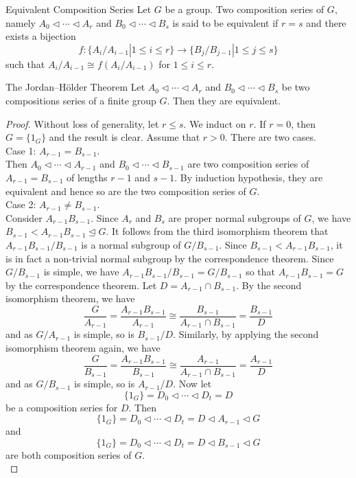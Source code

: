 \documentclass[a4paper]{article}
\begin{document}
\begin{defn}{Equivalent Composition Series}{} Let $G$ be a group. Two composition series of $G$, namely $A_0\triangleleft\cdots\triangleleft A_r$ and $B_0\triangleleft\cdots\triangleleft B_s$ is said to be equivalent if $r=s$ and there exists a bijection $$f:\{A_i/A_{i-1}|1\leq i\leq r\}\to\{B_j/B_{j-1}|1\leq j\leq s\}$$ such that $A_i/A_{i-1}\cong f(A_i/A_{i-1})$ for $1\leq i\leq r$. 
\end{defn}

\begin{thm}{The Jordan–Hölder Theorem}{} Let $A_0\triangleleft\cdots\triangleleft A_r$ and $B_0\triangleleft\cdots\triangleleft B_s$ be two compositions series of a finite group $G$. Then they are equivalent. 
\begin{proof}
Without loss of generality, let $r\leq s$. We induct on $r$. If $r=0$, then $G=\{1_G\}$ and the result is clear. Assume that $r>0$. There are two cases. \\

Case 1: $A_{r-1}=B_{s-1}$. \\
Then $A_0\triangleleft\cdots\triangleleft A_{r-1}$ and $B_0\triangleleft\cdots\triangleleft B_{s-1}$ are two composition series of $A_{r-1}=B_{s-1}$ of lengths $r-1$ and $s-1$. By induction hypothesis, they are equivalent and hence so are the two composition series of $G$. \\

Case 2: $A_{r-1}\neq B_{s-1}$. \\
Consider $A_{r-1}B_{s-1}$. Since $A_r$ and $B_s$ are proper normal subgroups of $G$, we have $B_{s-1}<A_{r-1}B_{s-1}\trianglelefteq G$. It follows from the third isomorphism theorem that $A_{r-1}B_{s-1}/B_{s-1}$ is a normal subgroup of $G/B_{s-1}$. Since $B_{s-1}<A_{r-1}B_{s-1}$, it is in fact a non-trivial normal subgroup by the correspondence theorem. Since $G/B_{s-1}$ is simple, we have $A_{r-1}B_{s-1}/B_{s-1}=G/B_{s-1}$ so that $A_{r-1}B_{s-1}=G$ by the correspondence theorem. Let $D=A_{r-1}\cap B_{s-1}$. By the second isomorphism theorem, we have $$\frac{G}{A_{r-1}}=\frac{A_{r-1}B_{s-1}}{A_{r-1}}\cong\frac{B_{s-1}}{A_{r-1}\cap B_{s-1}}=\frac{B_{s-1}}{D}$$ and as $G/A_{r-1}$ is simple, so is $B_{s-1}/D$. Similarly, by applying the second isomorphism theorem again, we have $$\frac{G}{B_{s-1}}=\frac{A_{r-1}B_{s-1}}{B_{s-1}}\cong\frac{A_{r-1}}{A_{r-1}\cap B_{s-1}}=\frac{A_{r-1}}{D}$$ and as $G/B_{s-1}$ is simple, so is $A_{r-1}/D$. Now let $$\{1_G\}=D_0\triangleleft\cdots\triangleleft D_t=D$$ be a composition series for $D$. Then $$\{1_G\}=D_0\triangleleft\cdots\triangleleft D_t=D\triangleleft A_{r-1}\triangleleft G$$ and $$\{1_G\}=D_0\triangleleft\cdots\triangleleft D_t=D\triangleleft B_{s-1}\triangleleft G$$ are both composition series of $G$. \\


\end{proof}
\end{thm}
\end{document}
